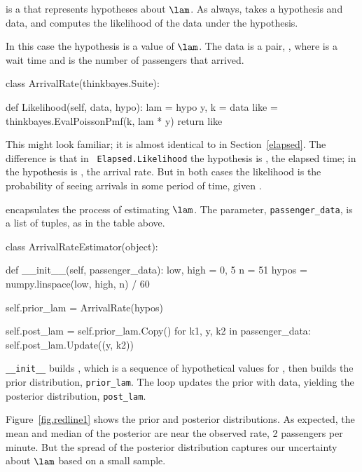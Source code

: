 \documentclass[12pt]{book}
\theoremstyle{exercise}
\begin{document}
 is a  that represents hypotheses about
$\lam$.  As always,  takes a hypothesis and data,
and computes the likelihood of the data under the hypothesis.

In this case the hypothesis is a value of $\lam$.  The data is a
pair, , where  is a wait time and  is the
number of passengers that arrived.

\begin{code}
class ArrivalRate(thinkbayes.Suite):

    def Likelihood(self, data, hypo):
        lam = hypo
        y, k = data
        like = thinkbayes.EvalPoissonPmf(k, lam * y)
        return like
\end{code}

This  might look familiar; it
is almost identical to  in
Section~\ref{elapsed}.  The difference is that in {\tt
  Elapsed.Likelihood} the hypothesis is , the elapsed time; in
 the hypothesis is , the arrival
rate.  But in both cases the likelihood is the probability of seeing
 arrivals in some period of time, given .

 encapsulates the process of estimating
$\lam$.  The parameter, \verb"passenger_data", is a list
of  tuples, as in the table above.

\begin{code}
class ArrivalRateEstimator(object):

    def __init__(self, passenger_data):
        low, high = 0, 5
        n = 51
        hypos = numpy.linspace(low, high, n) / 60

        self.prior_lam = ArrivalRate(hypos)

        self.post_lam = self.prior_lam.Copy()
        for k1, y, k2 in passenger_data:
            self.post_lam.Update((y, k2))
\end{code}

\verb"__init__" builds
, which is a sequence of hypothetical values for ,
then builds the prior distribution, \verb"prior_lam".
The  loop updates the prior with data, yielding the posterior
distribution, \verb"post_lam".

Figure~\ref{fig.redline1} shows
the prior and posterior distributions.  As expected, the mean and
median of the posterior are near the observed rate, 2 passengers per
minute.  But the spread of the posterior distribution captures our
uncertainty about $\lam$ based on a small sample.
\end{document}
